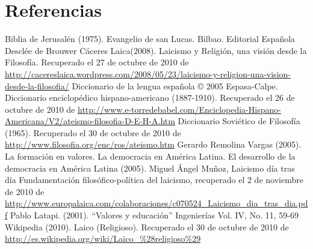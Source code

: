 \section{Referencias}
Biblia de Jerusalén (1975). Evangelio de san Lucas. Bilbao. Editorial Española Desclée de Brouwer
Cáceres Laica(2008). Laicismo y Religión, una visión desde la Filosofía. Recuperado el 27 de octubre de 2010 de \url{http://cacereslaica.wordpress.com/2008/05/23/laicismo-y-religion-una-vision-desde-la-filosofia/}
Diccionario de la lengua española © 2005 Espasa-Calpe.
Diccionario enciclopédico hispano-americano (1887-1910). Recuperado el 26 de octubre de 2010 de \url{http://www.e-torredebabel.com/Enciclopedia-Hispano-Americana/V2/ateismo-filosofia-D-E-H-A.htm}
Diccionario Soviético de Filosofía (1965). Recuperado el 30 de octubre de 2010 de \url{http://www.filosofia.org/enc/ros/ateismo.htm}
Gerardo Remolina Vargas (2005). La formación en valores.
La democracia en América Latina. El desarrollo de la democracia en América Latina (2005).
Miguel Ángel Muñoz, Laicismo día tras día Fundamentación filosófico-política del laicismo, recuperado el 2 de noviembre de 2010 de \url{http://www.europalaica.com/colaboraciones/c070524_Laicismo_dia_tras_dia.pdf}
Pablo Latapi. (2001). “Valores y educación” Ingenierías Vol. IV, No. 11, 59-69
Wikipedia (2010). Laico (Religioso). Recuperado el 30 de octubre de 2010 de \url{http://es.wikipedia.org/wiki/Laico_%28religioso%29}
